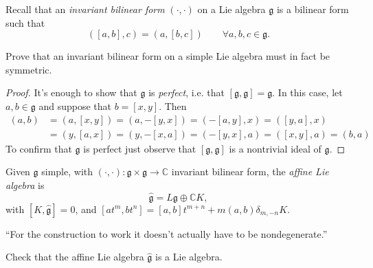 Recall that an {\it invariant bilinear form} $(\cdot,\cdot)$ on a Lie algebra
$\mathfrak{g}$ is a bilinear form such that
\begin{equation}
\label{equation-invariant-bilinear-form}
([a,b],c)=(a,[b,c])\qquad \forall a,b,c \in \mathfrak{g}.
\end{equation}

\begin{exercise}
\label{exercise-invariant-bilinear-form-on-simple-Lie-algebra-is-symmetric}
Prove that an invariant bilinear form on a simple Lie algebra must in fact be
symmetric.
\end{exercise}

\begin{proof}
It's enough to show that $\mathfrak{g}$ is
{\it perfect}, i.e. that $[\mathfrak{g},\mathfrak{g}]=\mathfrak{g}$. In this
case, let $a,b \in \mathfrak{g}$ and suppose that $b=[x,y]$. Then
\begin{align*}
(a,b)&=(a,[x,y])=(a,-[y,x])=(-[a,y],x)=([y,a],x)\\
&=(y,[a,x])=(y,-[x,a])=(-[y,x],a)=([x,y],a)=(b,a)
\end{align*}
To confirm that $\mathfrak{g}$ is perfect just observe that
$[\mathfrak{g},\mathfrak{g}]$ is a nontrivial ideal of $\mathfrak{g}$.
\end{proof}

\begin{definition}
\label{definition-affine-Lie-algebra}
Given $\mathfrak{g}$ simple, with 
$(\cdot,\cdot):\mathfrak{g} \times \mathfrak{g} \to \mathbb{C}$ 
invariant bilinear form, the {\it affine Lie algebra} is 
$$
\hat{\mathfrak{g}}=L\mathfrak{g} \oplus \mathbb{C}K,
$$
with $[K,\hat{\mathfrak{g}}]=0$, and 
$[at^m,bt^n]=[a,b]t^{m+n}+m(a,b)\delta_{m,-n}K$.
\end{definition}

``For the construction to work it doesn't actually have to be nondegenerate.''

\begin{exercise}
\label{exercise-affine-Lie-algebra-is-Lie-algebra}
Check that the affine Lie algebra $\hat{\mathfrak{g}}$ is a Lie algebra.
\end{exercise}

